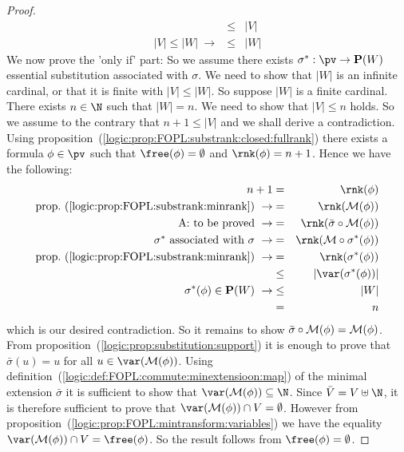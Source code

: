 \begin{proof}
\begin{eqnarray*}
    &\leq&|V|\\
    |V|\leq|W|\ \rightarrow&\leq&|W|
    \end{eqnarray*}
We now prove the 'only if' part: So we assume there exists
$\sigma^{*}:\pv\to{\bf P}(W)$ essential substitution associated with
$\sigma$. We need to show that $|W|$ is an infinite cardinal, or
that it is finite with $|V|\leq |W|$. So suppose $|W|$ is a finite
cardinal. There exists $n\in\N$ such that $|W|=n$. We need to show
that $|V|\leq n$ holds. So we assume to the contrary that
$n+1\leq|V|$ and we shall derive a contradiction. Using
proposition~(\ref{logic:prop:FOPL:substrank:closed:fullrank}) there
exists a formula $\phi\in\pv$ such that $\free(\phi)=\emptyset$ and
$\rnk(\phi)=n+1$. Hence we have the following:
    \begin{eqnarray*}
    n+1&=&\rnk(\phi)\\
    \mbox{prop.~(\ref{logic:prop:FOPL:substrank:minrank})}\ \rightarrow
    &=&\rnk({\cal M}(\phi))\\
    \mbox{A: to be proved}\ \rightarrow
    &=&\rnk(\bar{\sigma}\circ{\cal M}(\phi))\\
    \mbox{$\sigma^{*}$ associated with $\sigma$}\ \rightarrow
    &=&\rnk({\cal M}\circ\sigma^{*}(\phi))\\
    \mbox{prop.~(\ref{logic:prop:FOPL:substrank:minrank})}\ \rightarrow
    &=&\rnk(\sigma^{*}(\phi))\\
    &\leq&|\var(\sigma^{*}(\phi))|\\
    \sigma^{*}(\phi)\in{\bf P}(W)\ \rightarrow&\leq&|W|\\
    &=&n
    \end{eqnarray*}
which is our desired contradiction. So it remains to show
$\bar{\sigma}\circ{\cal M}(\phi)={\cal M}(\phi)$. From
proposition~(\ref{logic:prop:substitution:support}) it is enough to
prove that $\bar{\sigma}(u)=u$ for all $u\in\var({\cal M}(\phi))$.
Using definition~(\ref{logic:def:FOPL:commute:minextensioon:map}) of
the minimal extension $\bar{\sigma}$ it is sufficient to show that
$\var({\cal M}(\phi))\subseteq\N$. Since $\bar{V}=V\uplus\N$, it is
therefore sufficient to prove that $\var({\cal M}(\phi))\cap
V=\emptyset$. However from
proposition~(\ref{logic:prop:FOPL:mintransform:variables}) we have
the equality $\var({\cal M}(\phi))\cap V=\free(\phi)$. So the result
follows from $\free(\phi)=\emptyset$.
\end{proof}
